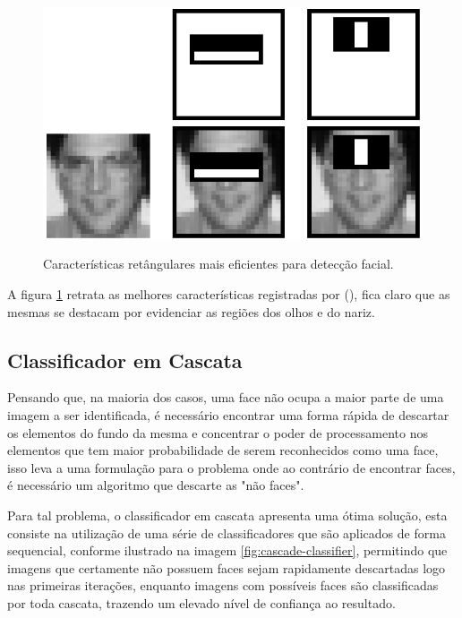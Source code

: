 \begin{figure}[htb]
    \centering
    \caption{Características retângulares mais eficientes para detecção facial.}
    \includegraphics[scale=.4]{figs/top-features.png}
    \label{fig:top-features}
 \end{figure}

 A figura \ref{fig:top-features} retrata as melhores características registradas por  (\citeyear{paper-viola-jones}), fica claro que as mesmas se destacam por evidenciar as regiões dos olhos e do nariz.

\subsection{Classificador em Cascata}

Pensando que, na maioria dos casos, uma face não ocupa a maior parte de uma imagem a ser identificada, é necessário encontrar uma forma rápida de descartar os elementos do fundo da mesma e concentrar o poder de processamento nos elementos que tem maior probabilidade de serem reconhecidos como uma face, isso leva a uma formulação para o problema onde ao contrário de encontrar faces, é necessário um algoritmo que descarte as "não faces".

Para tal problema, o classificador em cascata apresenta uma ótima solução, esta consiste na utilização de uma série de classificadores que são aplicados de forma sequencial, conforme ilustrado na imagem \ref{fig:cascade-classifier}, permitindo que imagens que certamente não possuem faces sejam rapidamente descartadas logo nas primeiras iterações, enquanto imagens com possíveis faces são classificadas por toda cascata, trazendo um elevado nível de confiança ao resultado.

